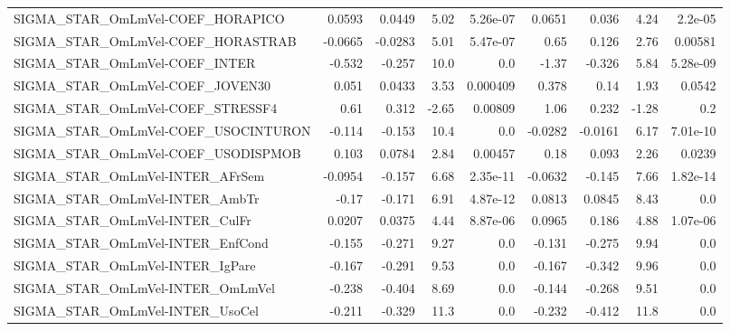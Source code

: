 \begin{tabular}{lrrrrrrrr}
SIGMA\_STAR\_OmLmVel-COEF\_HORAPICO      &      0.0593 &       0.0449 &     5.02 & 5.26e-07 &     0.0651 &       0.036 &         4.24 &       2.2e-05 \\
SIGMA\_STAR\_OmLmVel-COEF\_HORASTRAB     &     -0.0665 &      -0.0283 &     5.01 & 5.47e-07 &       0.65 &       0.126 &         2.76 &       0.00581 \\
SIGMA\_STAR\_OmLmVel-COEF\_INTER         &      -0.532 &       -0.257 &     10.0 &      0.0 &      -1.37 &      -0.326 &         5.84 &      5.28e-09 \\
SIGMA\_STAR\_OmLmVel-COEF\_JOVEN30       &       0.051 &       0.0433 &     3.53 & 0.000409 &      0.378 &        0.14 &         1.93 &        0.0542 \\
SIGMA\_STAR\_OmLmVel-COEF\_STRESSF4      &        0.61 &        0.312 &    -2.65 &  0.00809 &       1.06 &       0.232 &        -1.28 &           0.2 \\
SIGMA\_STAR\_OmLmVel-COEF\_USOCINTURON   &      -0.114 &       -0.153 &     10.4 &      0.0 &    -0.0282 &     -0.0161 &         6.17 &      7.01e-10 \\
SIGMA\_STAR\_OmLmVel-COEF\_USODISPMOB    &       0.103 &       0.0784 &     2.84 &  0.00457 &       0.18 &       0.093 &         2.26 &        0.0239 \\
SIGMA\_STAR\_OmLmVel-INTER\_AFrSem       &     -0.0954 &       -0.157 &     6.68 & 2.35e-11 &    -0.0632 &      -0.145 &         7.66 &      1.82e-14 \\
SIGMA\_STAR\_OmLmVel-INTER\_AmbTr        &       -0.17 &       -0.171 &     6.91 & 4.87e-12 &     0.0813 &      0.0845 &         8.43 &           0.0 \\
SIGMA\_STAR\_OmLmVel-INTER\_CulFr        &      0.0207 &       0.0375 &     4.44 & 8.87e-06 &     0.0965 &       0.186 &         4.88 &      1.07e-06 \\
SIGMA\_STAR\_OmLmVel-INTER\_EnfCond      &      -0.155 &       -0.271 &     9.27 &      0.0 &     -0.131 &      -0.275 &         9.94 &           0.0 \\
SIGMA\_STAR\_OmLmVel-INTER\_IgPare       &      -0.167 &       -0.291 &     9.53 &      0.0 &     -0.167 &      -0.342 &         9.96 &           0.0 \\
SIGMA\_STAR\_OmLmVel-INTER\_OmLmVel      &      -0.238 &       -0.404 &     8.69 &      0.0 &     -0.144 &      -0.268 &         9.51 &           0.0 \\
SIGMA\_STAR\_OmLmVel-INTER\_UsoCel       &      -0.211 &       -0.329 &     11.3 &      0.0 &     -0.232 &      -0.412 &         11.8 &           0.0 \\

\end{tabular}
